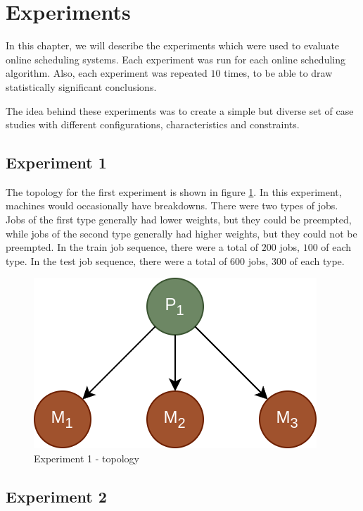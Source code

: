 \section{Experiments}
\label{sec:experiments}

In this chapter, we will describe the experiments which were used to evaluate online scheduling systems. Each experiment was run for each online scheduling algorithm. Also, each experiment was repeated $10$ times, to be able to draw statistically significant conclusions.

The idea behind these experiments was to create a simple but diverse set of case studies with different configurations, characteristics and constraints.

\subsection{Experiment 1}

The topology for the first experiment is shown in figure \ref{fig:experiment1_topology}. In this experiment, machines would occasionally have breakdowns. There were two types of jobs. Jobs of the first type generally had lower weights, but they could be preempted, while jobs of the second type generally had higher weights, but they could not be preempted. In the train job sequence, there were a total of $200$ jobs, $100$ of each type. In the test job sequence, there were a total of $600$ jobs, $300$ of each type.

\begin{figure}[!htbp]
	\centering
	\includegraphics[scale=0.3]{../images/experiment1_topology.png}
	\caption{Experiment 1 - topology}
    \label{fig:experiment1_topology}
\end{figure}

\subsection{Experiment 2}

